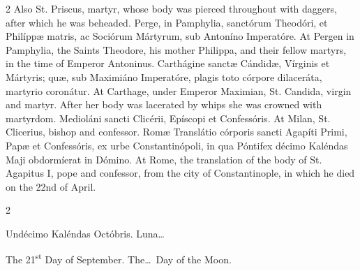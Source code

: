 \begin{paracol}{2}
Also St. Priscus, martyr, whose body 
 was pierced throughout with daggers, after which he was beheaded.
\switchcolumn*
{}
Perge, in Pamphylia, 
 sanctórum Theodóri, et Philíppæ matris, ac Sociórum Mártyrum, sub Antoníno 
 Imperatóre.
\switchcolumn
{}
At Pergen in Pamphylia, the Saints 
 Theodore, his mother Philippa, and their fellow martyrs, in the time of 
 Emperor Antoninus.
\switchcolumn*
{}
Carthágine sanctæ 
 Cándidæ, Vírginis et Mártyris; quæ, sub Maximiáno Imperatóre, plagis toto 
 córpore dilaceráta, martyrio coronátur.
\switchcolumn
{}
At Carthage, under Emperor Maximian, 
 St. Candida, virgin and martyr. After her body was lacerated by whips 
 she was crowned with martyrdom.
\switchcolumn*
{}
Medioláni sancti 
 Clicérii, Epíscopi et Confessóris.
\switchcolumn
{}
At Milan, St. Clicerius, bishop and 
 confessor.
\switchcolumn*
{}
Romæ Translátio 
 córporis sancti Agapíti Primi, Papæ et Confessóris, ex urbe Constantinópoli, 
 in qua Póntifex décimo Kaléndas Maji obdormíerat in Dómino.
\switchcolumn
{}
At Rome, the translation of the body 
 of St. Agapitus I, pope and confessor, from the city of Constantinople, in 
 which he died on the 22nd of April.
\switchcolumn*
{}
\end{paracol}


\begin{paracol}{2}
\begin{center}{\color{gregoriocolor} Undécimo Kaléndas Octóbris. 
 Luna\dots\ }\end{center}
\switchcolumn
{}
\begin{center}{\color{gregoriocolor} The   21\textsuperscript{st} Day of 
 September. The\dots\ Day of the Moon.}\end{center}
\end{paracol}

